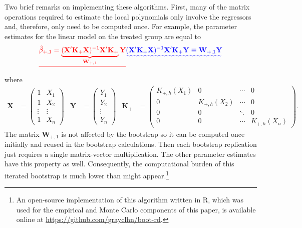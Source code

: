 \documentclass[12pt,fleqn]{article}
\providecommand{\DIFadd}[1]{{\protect\color{blue}\uwave{#1}}} %
\providecommand{\DIFdel}[1]{{\protect\color{red}\sout{#1}}}                      %
\providecommand{\DIFaddbegin}{} %
\providecommand{\DIFaddend}{} %
\providecommand{\DIFdelbegin}{} %
\providecommand{\DIFdelend}{} %
\begin{document}
Two brief remarks on implementing these algorithms. First, many of the matrix operations
required to estimate the local polynomials only involve the regressors and,
therefore, only need to be computed once. For example, the parameter estimates
for the linear model on the treated group are equal to
\[
\DIFdelbegin \DIFdel{\hat\beta_{+,1} = \underbrace{(\mathbf{X}' \mathbf{K}_+ \mathbf{X})^{-1} \mathbf{X}' \mathbf{K}_+}_{\mathbf{W}_{+,1}} \mathbf{Y}} \DIFdelend
\DIFaddbegin \DIFadd{(\mathbf{X}' \mathbf{K}_+ \mathbf{X})^{-1} \mathbf{X}' \mathbf{K}_+ \mathbf{Y}
  \equiv \mathbf{W}_{+,1}\mathbf{Y}} \DIFaddend
\]
where
\begin{align*}
\mathbf{X} &= \begin{pmatrix*} 1 & X_1 \\ 1 & X_2 \\ \vdots & \vdots \\ 1 & X_n \end{pmatrix*} &
\mathbf{Y} &= \begin{pmatrix*} Y_1 \\ Y_2 \\ \vdots \\ Y_n \end{pmatrix*} &
\mathbf{K}_+ &= \begin{pmatrix*}
  K_{+,h}(X_1) & 0 & \cdots & 0 \\
  0 & K_{+,h}(X_2) & \cdots & 0 \\
  0 & 0 & \ddots & 0 \\
  0 & 0 & \cdots & K_{+,h}(X_n) \end{pmatrix*}.
\end{align*}
The matrix $\mathbf{W}_{+,1}$ is not affected by the bootstrap so it can be
computed once initially and reused in the bootstrap calculations. Then each
bootstrap replication just requires a single matrix-vector multiplication. The
other parameter estimates have this property as well. Consequently, the
computational burden of this iterated bootstrap is much lower than might
appear.\footnote{%
  An open-source implementation of this algorithm written in R, which was used
  for the empirical and Monte Carlo components of this paper, is available
  online at \url{https://github.com/grayclhn/boot-rd}.} %
\end{document}
